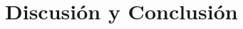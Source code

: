 
\chapter{Discusión y Conclusión}

\ifpdf
    \graphicspath{{Chapter5/Figs/Raster/}{Chapter5/Figs/PDF/}{Chapter5/Figs/}}
\else
    \graphicspath{{Chapter5/Figs/Vector/}{Chapter5/Figs/}}
\fi

